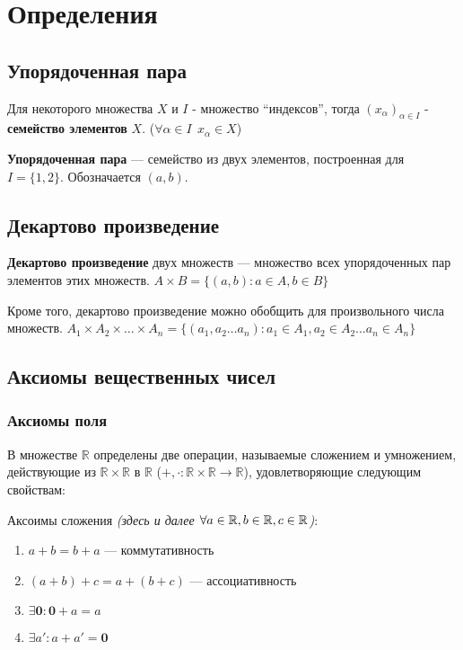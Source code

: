 

\usepackage{bm}
\usepackage{xcolor}

\cfoot{}
\rfoot{}

\setlength\parindent{0pt}


\section{Определения}
\subsection{Упорядоченная пара}
Для некоторого множества $X$ и $I$ - множество ``индексов'', тогда $(x_\alpha)_{\alpha\in I}$ - \textbf{семейство элементов} $X$. ($\forall \alpha\in I \ \ x_\alpha \in X$)

\textbf{Упорядоченная пара} --- семейство из двух элементов, построенная для $I=\{1, 2\}$. Обозначается $(a, b)$.
\subsection{Декартово произведение}
\textbf{Декартово произведение} двух множеств --- множество всех упорядоченных пар элементов этих множеств. $A\times B=\{(a,b): a\in A, b\in B\}$

Кроме того, декартово произведение можно обобщить для произвольного числа множеств. $A_1\times A_2\times\ldots\times A_n = \{(a_1,a_2\ldots a_n) : a_1\in A_1, a_2\in A_2\ldots a_n\in A_n\}$

\subsection{Аксиомы вещественных чисел}
\subsubsection{Аксиомы поля}
В множестве $\mathbb{R}$ определены две операции, называемые сложением и умножением, действующие из $\mathbb{R}\times\mathbb{R}$ в $\mathbb{R}$ ($+,\cdot:\mathbb{R}\times\mathbb{R} \rightarrow \mathbb{R}$), удовлетворяющие следующим свойствам:

Аксоимы сложения \textit{(здесь и далее $\forall a\in \operatorname*{\mathbb{R}}, b\in \operatorname*{\mathbb{R}}, c\in \operatorname*{\mathbb{R}}$)}:
\begin{enumerate}
    \itemsep0em
    \item $a+b=b+a$ --- коммутативность
    \item $(a+b)+c=a+(b+c)$ --- ассоциативность
    \item $\exists \bm{0}: \bm0+a=a$
    \item $\exists a': a+a'=\bm 0$
\end{enumerate}

